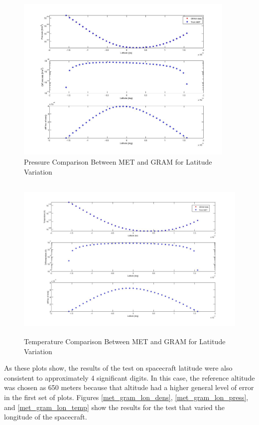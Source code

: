 \begin{description}
\begin{figure}[H]
\begin{center}
\includegraphics[height=80mm]{pics/MET_GRA_T02_pressure.jpg}
\caption{Pressure Comparison Between MET and GRAM for Latitude Variation}
\label{met_gram_lat_press}
\end{center}
\end{figure}

\begin{figure}[H]
\begin{center}
\includegraphics[height=80mm]{pics/MET_GRA_T02_temperature.jpg}
\caption{Temperature Comparison Between MET and GRAM for Latitude Variation}
\label{met_gram_lat_temp}
\end{center}
\end{figure}

As these plots show, the results of the test on spacecraft latitude were also
consistent to approximately 4 significant digits.  In this case, the reference
altitude was chosen as 650 meters because that altitude had a higher general
level of error in the first set of plots.  Figures \ref{met_gram_lon_dens},
\ref{met_gram_lon_press}, and \ref{met_gram_lon_temp} show the results for the
test that varied the longitude of the spacecraft.


\end{description}
